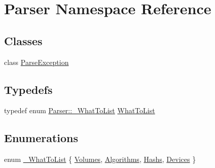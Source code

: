 \hypertarget{namespace_parser}{}\section{Parser Namespace Reference}
\label{namespace_parser}
\subsection*{Classes}
\begin{DoxyCompactItemize}
\item 
class \hyperlink{class_parser_1_1_parse_exception}{Parse\+Exception}
\end{DoxyCompactItemize}
\subsection*{Typedefs}
\begin{DoxyCompactItemize}
\item 
typedef enum \hyperlink{namespace_parser_a14d933590cba0d907aaff7ff9ab01035}{Parser\+::\+\_\+\+What\+To\+List} \hyperlink{namespace_parser_a1f62f98026c9b835ba6b9a3210a25b8b}{What\+To\+List}
\end{DoxyCompactItemize}
\subsection*{Enumerations}
\begin{DoxyCompactItemize}
\item 
enum \hyperlink{namespace_parser_a14d933590cba0d907aaff7ff9ab01035}{\+\_\+\+What\+To\+List} \{ \hyperlink{namespace_parser_a14d933590cba0d907aaff7ff9ab01035af556faea7b038e9e6b527d5b62881e47}{Volumes}, 
\hyperlink{namespace_parser_a14d933590cba0d907aaff7ff9ab01035a63aaef8b1b40edc5ad483ae0460244e4}{Algorithms}, 
\hyperlink{namespace_parser_a14d933590cba0d907aaff7ff9ab01035a273fa94994418bb70148e0f40b36bde1}{Hashs}, 
\hyperlink{namespace_parser_a14d933590cba0d907aaff7ff9ab01035ad4d47d038e677f5cf0551ded706497a6}{Devices}
 \}
\end{DoxyCompactItemize}
